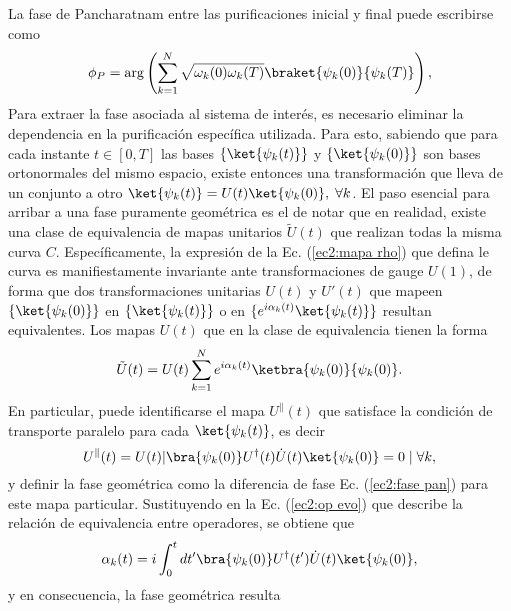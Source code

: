 La fase de Pancharatnam entre las purificaciones inicial y final puede escribirse como
\begin{equation} 
    \phi_P=\arg \left( \sum_{k=1}^{N} \sqrt{\omega_k(0)\omega_k(T)}\braket{\psi_k(0)}{\psi_k(T)} \right),
    \label{ec2:fase pan}
\end{equation}
Para extraer la fase asociada al sistema de interés, es necesario eliminar la dependencia en la purificación específica utilizada. Para esto, sabiendo que para cada instante $t\in[0,T]$ las bases $\{\ket{\psi_k(t)}\}$ y $\{\ket{\psi_k(0)}\}$ son bases ortonormales del mismo espacio, existe entonces una transformación que lleva de un conjunto a otro $\ket{\psi_k(t)}=U(t)\ket{\psi_k(0)} ,  \; \forall k$. El paso esencial para arribar a una fase puramente geométrica es el de notar que en realidad, existe una clase de equivalencia de mapas unitarios $\tilde U(t)$ que realizan todas la misma curva $C$. Específicamente, la expresión de la Ec. (\ref{ec2:mapa rho}) que defina le curva es manifiestamente invariante ante transformaciones de gauge $U(1)$, de forma que dos transformaciones unitarias $U(t)$ y $U'(t)$ que mapeen $\{\ket{\psi_k(0)}\}$ en $\{\ket{\psi_k(t)}\}$ o en $\{e^{i\alpha_k(t)}\ket{\psi_k(t)}\}$ resultan equivalentes. Los mapas $U(t)$ que en la clase de equivalencia tienen la forma 
\begin{equation}
    \tilde U(t) = U(t)\sum_{k=1}^{N}e^{i\alpha_k(t)}\ketbra{\psi_k(0)}{\psi_k(0)}.
    \label{ec2:op evo}
\end{equation}
En particular, puede identificarse el mapa $U^\parallel(t)$ que satisface la condición de transporte paralelo para cada $\ket{\psi_k(t)}$, es decir
\begin{equation}
U^\parallel(t)=U(t) | \bra{\psi_k(0)}U^\dagger(t)\dot U(t)\ket{\psi_k(0)}=0 \; |  \; \forall k,
\end{equation}
y definir la fase geométrica como la diferencia de fase Ec. (\ref{ec2:fase pan}) para este mapa particular. Sustituyendo en la Ec. (\ref{ec2:op evo}) que describe la relación de equivalencia entre operadores, se obtiene que 
\begin{equation}
    \alpha_k(t)=i\int_{0}^{t}dt'\bra{\psi_k(0)}U^\dagger(t')\dot U(t)\ket{\psi_k(0)},
\end{equation}
y en consecuencia, la fase geométrica resulta


